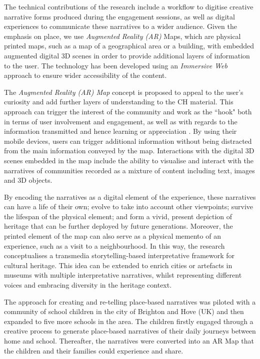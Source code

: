 \documentclass[acmlarge,screen,dvipsnames]{acmart}
\begin{document}
The technical contributions of the research include a workflow to digitise creative narrative forms produced during the engagement sessions, as well as digital experiences to communicate these narratives to a wider audience. Given the emphasis on place, we use \emph{Augmented Reality (AR)} Maps, which are physical printed
maps, such as a map of a geographical area or a building, with embedded augmented digital 3D scenes in order to provide additional layers of information to the user. The technology has been developed using an
\emph{Immersive Web} approach to ensure wider accessibility of the content.

The \emph{Augmented Reality (AR) Map} concept is proposed to appeal to the
user's curiosity and add further layers of understanding to the CH material. This approach can trigger the interest of the community and work as the ``hook" both in terms of user involvement and engagement, as well as with regards to the information
transmitted and hence learning or appreciation \cite{Csikszentmihalyi1995}. By using their mobile devices, users can trigger additional
information without being distracted from the main information conveyed by the
map. Interactions with the digital 3D scenes embedded in the map include
the ability to visualise and interact with the narratives of communities
recorded as a mixture of content including text, images and 3D objects. 

By encoding the narratives as a digital element of the experience, these
narratives can have a life of their own; evolve to take into account
other viewpoints; survive the lifespan of the physical element; and form
a vivid, present depiction of heritage that can be further deployed by future
generations. Moreover, the printed element of the map can also serve as a physical
memento of an experience, such as a visit to a neighbourhood. In this
way, the research conceptualises a transmedia storytelling-based
interpretative framework for cultural heritage. This idea can be
extended to enrich cities or artefacts in museums with multiple
interpretative narratives, whilst representing different voices and embracing
diversity in the heritage context.

The approach for creating and re-telling place-based narratives was
piloted with a community of school children in the city of Brighton and
Hove (UK) and then expanded to five more schools in the area. The children firstly engaged through a creative process to generate place-based narratives of their
daily journeys between home and school. Thereafter, the narratives were
converted into an AR Map that the children and their families could
experience and share.
\end{document}
